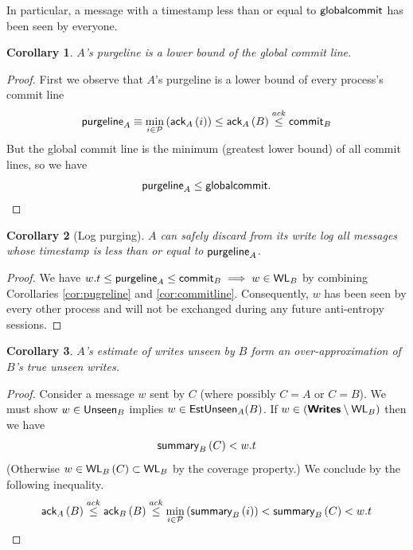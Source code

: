 \documentclass[]             %
{NASA}                       %
\newtheorem{corollary}{Corollary}[theorem]
\theoremstyle{definition}
\begin{document}
In particular, a message with a timestamp less than or equal to $\textsf{globalcommit}$ has been seen by everyone.

\begin{corollary}
  \label{cor:purgeline}
  $A$'s purgeline is a lower bound of the global commit line.
\end{corollary}
\begin{proof}
  First we observe that $A$'s purgeline is a lower bound of every process's commit line
  \[\textsf{purgeline}_{A} \equiv \min_{i \in \mathcal{P}} \left( \textsf{ack}_{A}\left(i\right) \right) \leq \textsf{ack}_{A}\left(B\right) \overset{ack}{\leq} \textsf{commit}_{B}
  \]
  But the global commit line is the minimum (greatest lower bound) of all commit lines, so we have
  \[ \textsf{purgeline}_{A} \leq \textsf{globalcommit}. \]
\end{proof}

\begin{corollary}[Log purging]
  \label{cor:purge}
  $A$ can safely discard from its write log all messages whose timestamp is less than or equal to $\textsf{purgeline}_{A}$.
\end{corollary}
\begin{proof}
  We have $w.t \leq \textsf{purgeline}_{A} \leq \textsf{commit}_{B} \implies w \in \textsf{WL}_{B}$ by combining Corollaries \ref{cor:pugreline} and \ref{cor:commitline}.
  Consequently, $w$ has been seen by every other process and will not be exchanged during any future anti-entropy sessions.
\end{proof}

\begin{corollary}
  \label{cor:unseenest}
  $A$'s estimate of writes unseen by $B$ form an over-approximation of $B$'s true unseen writes.
\end{corollary}
\begin{proof}
  Consider a message $w$ sent by $C$ (where possibly $C = A$ or $C = B$). We must show
  $w \in \textsf{Unseen}_{B}$ implies $w \in \textsf{EstUnseen}_{A}{\left(B\right)}$.  If $w \in \left(\textbf{\textsf{Writes}} \setminus \textsf{WL}_{B}\right)$ then we have
  \[ \textsf{summary}_{B}\left(C\right) < w.t\]
  (Otherwise $w \in \textsf{WL}_{B}\left(C\right) \subset \textsf{WL}_{B}$ by the coverage property.)
  We conclude by the following inequality.
  \[\textsf{ack}_{A}\left(B\right) \overset{ack}{\leq} \textsf{ack}_{B}\left(B\right) \overset{ack}{\leq} \min_{i \in \mathcal{P}} \left(\textsf{summary}_{B}\left(i\right)\right) < \textsf{summary}_{B}\left(C\right) < w.t\]
\end{proof}
\end{document}
